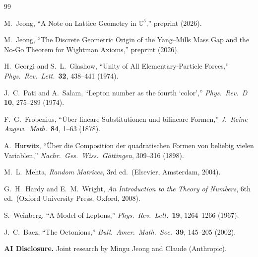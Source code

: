 \documentclass[12pt]{article}
\theoremstyle{remark}
\begin{document}
\begin{thebibliography}{99}

 M.~Jeong, ``A Note on Lattice Geometry in
  $\mathbb{C}^5$,'' preprint (2026).

 M.~Jeong, ``The Discrete Geometric Origin of the
  Yang--Mills Mass Gap and the No-Go Theorem for Wightman Axioms,''
  preprint (2026).

 H.~Georgi and S.~L.~Glashow,
  ``Unity of All Elementary-Particle Forces,''
  \emph{Phys.\ Rev.\ Lett.}\ \textbf{32}, 438--441 (1974).

 J.~C.~Pati and A.~Salam,
  ``Lepton number as the fourth `color',''
  \emph{Phys.\ Rev.\ D} \textbf{10}, 275--289 (1974).

 F.~G.~Frobenius,
  ``\"Uber lineare Substitutionen und bilineare Formen,''
  \emph{J.\ Reine Angew.\ Math.}\ \textbf{84}, 1--63 (1878).

 A.~Hurwitz,
  ``\"Uber die Composition der quadratischen Formen von beliebig
  vielen Variablen,'' \emph{Nachr.\ Ges.\ Wiss.\ G\"ottingen},
  309--316 (1898).

 M.~L.~Mehta,
  \emph{Random Matrices}, 3rd ed.\ (Elsevier, Amsterdam, 2004).

 G.~H.~Hardy and E.~M.~Wright,
  \emph{An Introduction to the Theory of Numbers}, 6th ed.\
  (Oxford University Press, Oxford, 2008).

 S.~Weinberg,
  ``A Model of Leptons,''
  \emph{Phys.\ Rev.\ Lett.}\ \textbf{19}, 1264--1266 (1967).

 J.~C.~Baez,
  ``The Octonions,''
  \emph{Bull.\ Amer.\ Math.\ Soc.}\ \textbf{39}, 145--205 (2002).

\end{thebibliography}

\bigskip
\noindent\textbf{AI Disclosure.} Joint research by Mingu Jeong and
Claude (Anthropic).
\end{document}
